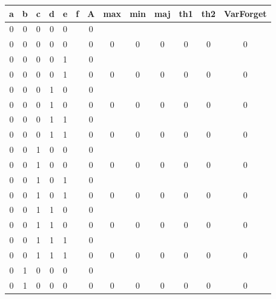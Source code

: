 \begin{table}[!tb]
    \centering
    \begin{tabular}{|c|c|c|c|c|c|c|c|c|c|c|c|c|}
        \hline
        \textbf{a} & \textbf{b} & \textbf{c} & \textbf{d} & \textbf{e} & \textbf{f} & \textbf{A} & \textbf{max} & \textbf{min} & \textbf{maj} & \textbf{th1} & \textbf{th2} & \textbf{VarForget} \\ \hline
        \rowcolor{gray!40} 0 & 0 & 0 & 0 & 0 &  & 0 &  &  &  &  &  &  \\ \hline
        \rowcolor{gray!40} 0 & 0 & 0 & 0 & 0 &  & 0 & 0 & 0 & 0 & 0 & 0 & 0 \\ \hline
        \rowcolor{blue!40} 0 & 0 & 0 & 0 & 1 &  & 0 &  &  &  &  &  &  \\ \hline
        \rowcolor{blue!40} 0 & 0 & 0 & 0 & 1 &  & 0 & 0 & 0 & 0 & 0 & 0 & 0 \\ \hline
        \rowcolor{red!40} 0 & 0 & 0 & 1 & 0 &  & 0 &  &  &  &  &  &  \\ \hline
        \rowcolor{red!40} 0 & 0 & 0 & 1 & 0 &  & 0 & 0 & 0 & 0 & 0 & 0 & 0 \\ \hline
        \rowcolor{green!40} 0 & 0 & 0 & 1 & 1 &  & 0 &  &  &  &  &  &  \\ \hline
        \rowcolor{green!40} 0 & 0 & 0 & 1 & 1 &  & 0 & 0 & 0 & 0 & 0 & 0 & 0 \\ \hline
        \rowcolor{yellow!40} 0 & 0 & 1 & 0 & 0 &  & 0 &  &  &  &  &  &  \\ \hline
        \rowcolor{yellow!40} 0 & 0 & 1 & 0 & 0 &  & 0 & 0 & 0 & 0 & 0 & 0 & 0 \\ \hline
        \rowcolor{gray!40} 0 & 0 & 1 & 0 & 1 &  & 0 &  &  &  &  &  &  \\ \hline
        \rowcolor{gray!40} 0 & 0 & 1 & 0 & 1 &  & 0 & 0 & 0 & 0 & 0 & 0 & 0 \\ \hline
        \rowcolor{blue!40} 0 & 0 & 1 & 1 & 0 &  & 0 &  &  &  &  &  &  \\ \hline
        \rowcolor{blue!40} 0 & 0 & 1 & 1 & 0 &  & 0 & 0 & 0 & 0 & 0 & 0 & 0 \\ \hline
        \rowcolor{red!40} 0 & 0 & 1 & 1 & 1 &  & 0 &  &  &  &  &  &  \\ \hline
        \rowcolor{red!40} 0 & 0 & 1 & 1 & 1 &  & 0 & 0 & 0 & 0 & 0 & 0 & 0 \\ \hline
        \rowcolor{green!40} 0 & 1 & 0 & 0 & 0 &  & 0 &  &  &  &  &  &  \\ \hline
        \rowcolor{green!40} 0 & 1 & 0 & 0 & 0 &  & 0 & 0 & 0 & 0 & 0 & 0 & 0 \\ \hline

\end{tabular}
\end{table}
